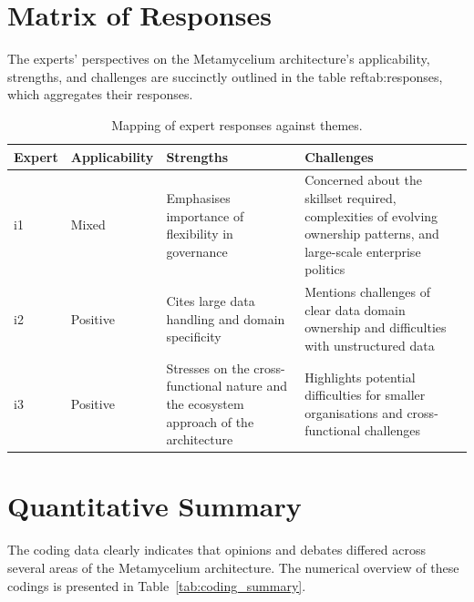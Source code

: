 \documentclass[journal]{IEEEtran}
\begin{document}
\section{Matrix of Responses} \label{expertOpinion_matrixResponses}

The experts' perspectives on the Metamycelium architecture's applicability, strengths, and challenges are succinctly outlined in the table reftab:responses, which aggregates their responses.

\begin{table}[h]
  \centering
  \caption{Mapping of expert responses against themes.}
  \begin{tabular}{@{}llp{}p{}@{}}
  \hline
  Expert & Applicability & Strengths & Challenges \\
  \hline
  i1 & Mixed & Emphasises importance of flexibility in governance & Concerned about the skillset required, complexities of evolving ownership patterns, and large-scale enterprise politics \\
  i2 & Positive & Cites large data handling and domain specificity & Mentions challenges of clear data domain ownership and difficulties with unstructured data \\
  i3 & Positive & Stresses on the cross-functional nature and the ecosystem approach of the architecture & Highlights potential difficulties for smaller organisations and cross-functional challenges \\
  \hline
  \end{tabular}
  \label{tab:responses}
\end{table}


\section{Quantitative Summary} \label{expertOpinion_quantitativeSummary}


The coding data clearly indicates that opinions and debates differed across several areas of the Metamycelium architecture. The numerical overview of these codings is presented in Table~\ref{tab:coding_summary}.
\end{document}
